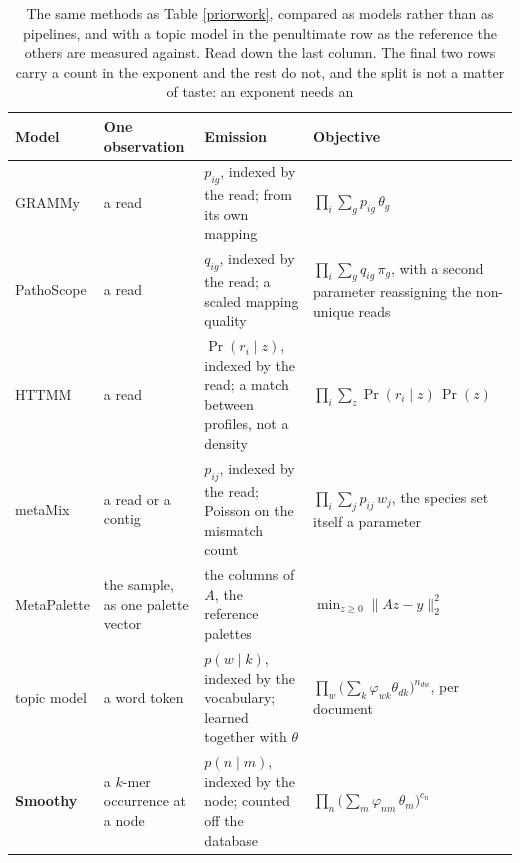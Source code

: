 \documentclass[pdflatex,sn-vancouver-num]{sn-jnl}
\begin{document}
    \begin{table}[!htbp]
        \centering
        \footnotesize
        \setlength{\tabcolsep}{3.5pt}
        \begin{tabular}{@{}l|p{2.3cm}|p{3.4cm}|p{3.6cm}@{}}
            \textbf{Model} & \textbf{One observation} & \textbf{Emission} & \textbf{Objective}\\
            \hline
            GRAMMy \citep{grammy} & a read & $p_{ig}$, indexed by the read; from its own mapping &
                $\prod_i \sum_g p_{ig}\, \theta_g$\\
            PathoScope \citep{pathoscope} & a read & $q_{ig}$, indexed by the read; a scaled mapping
                quality &
                $\prod_i \sum_g q_{ig}\, \pi_g$, with a second parameter reassigning the non-unique
                reads\\
            HTTMM \citep{httmm} & a read & \mbox{$\Pr(r_i \mid z)$}, indexed by the read; a match between
                profiles, not a density &
                $\prod_i \sum_z \Pr(r_i \mid z)\, \Pr(z)$\\
            metaMix \citep{metamix} & a read or a contig & $p_{ij}$, indexed by the read; Poisson on
                the mismatch count &
                $\prod_i \sum_j p_{ij}\, w_j$, the species set itself a parameter\\
            MetaPalette \citep{metapalette} & the sample, as one palette vector & the columns of $A$,
                the reference palettes &
                $\min_{z \geq 0} \lVert Az - y \rVert_2^2$\\
            topic model \citep{blei2003lda} & a word token & \mbox{$p(w \mid k)$}, indexed by the
                vocabulary; learned together with $\theta$ &
                $\prod_w \bigl( \sum_k \varphi_{wk} \theta_{dk} \bigr)^{n_{dw}}$, per document\\
            \textbf{Smoothy} & a $k$-mer occurrence at a node & \mbox{$p(n \mid m)$}, indexed by the
                node; counted off the database &
                $\prod_n \bigl( \sum_m \varphi_{nm}\, \theta_m \bigr)^{c_n}$\\
        \end{tabular}
        \caption{The same methods as Table \ref{priorwork}, compared as models rather than as
        pipelines, and with a topic model in the penultimate row as the reference the others are
        measured against. Read down the last column. The final two rows carry a count in the
        exponent and the rest do not, and the split is not a matter of taste: an exponent needs an
}
\end{table}
\end{document}
